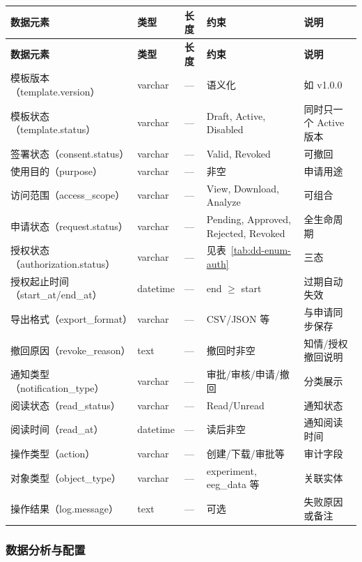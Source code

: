 {\small
\begin{longtable}{|p{32mm}|p{20mm}|p{16mm}|p{24mm}|p{42mm}|}
\hline
\textbf{数据元素} & \textbf{类型} & \textbf{长度} & \textbf{约束} & \textbf{说明}\\\hline
\endfirsthead
\hline
\textbf{数据元素} & \textbf{类型} & \textbf{长度} & \textbf{约束} & \textbf{说明}\\\hline
\endhead
模板版本（template.version）& varchar & --- & 语义化 & 如 v1.0.0 \\ \hline
模板状态（template.status）& varchar & --- & Draft, Active, Disabled & 同时只一个 Active 版本 \\ \hline
签署状态（consent.status）& varchar & --- & Valid, Revoked & 可撤回 \\ \hline
使用目的（purpose）& varchar & --- & 非空 & 申请用途 \\ \hline
访问范围（access\_scope）& varchar & --- & View, Download, Analyze & 可组合 \\ \hline
申请状态（request.status）& varchar & --- & Pending, Approved, Rejected, Revoked & 全生命周期 \\ \hline
授权状态（authorization.status）& varchar & --- & 见表~\ref{tab:dd-enum-auth} & 三态 \\ \hline
授权起止时间（start\_at/end\_at）& datetime & --- & end $\ge$ start & 过期自动失效 \\ \hline
导出格式（export\_format）& varchar & --- & CSV/JSON 等 & 与申请同步保存 \\ \hline
撤回原因（revoke\_reason）& text & --- & 撤回时非空 & 知情/授权撤回说明 \\ \hline
通知类型（notification\_type）& varchar & --- & 审批/审核/申请/撤回 & 分类展示 \\ \hline
阅读状态（read\_status）& varchar & --- & Read/Unread & 通知状态 \\ \hline
阅读时间（read\_at）& datetime & --- & 读后非空 & 通知阅读时间 \\ \hline
操作类型（action）& varchar & --- & 创建/下载/审批等 & 审计字段 \\ \hline
对象类型（object\_type）& varchar & --- & experiment, eeg\_data 等 & 关联实体 \\ \hline
操作结果（log.message）& text & --- & 可选 & 失败原因或备注 \\ \hline
\end{longtable}
}

\subsubsection{数据分析与配置}

